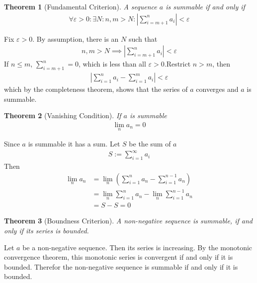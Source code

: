 \documentclass{amsart}
\numberwithin{equation}{section}
\let\oldendproof\endproof
\renewenvironment{proof}[1][\proofname]{%
  \setcounter{case}{0}
  \setcounter{step}{0}
  \oldproof[#1]%
}{\oldendproof}
\theoremstyle{plain}
\newtheorem{theorem}{Theorem}[section]
\theoremstyle{definition}
\theoremstyle{remark}
\begin{document}
\begin{theorem}[Fundamental Criterion]
  A sequence $a$ is summable if and only if
  \begin{align}
    \forall \varepsilon > 0: \exists N: n, m> N: \left| \sum_{i=m+1}^n a_i \right| < \varepsilon
  \end{align}
\end{theorem}
\begin{proof}
  Fix $\varepsilon>0$. By assumption, there is an $N$ such that
  \begin{align}
    n, m > N \implies \left|\sum^n_{i=m+1} a_i \right| < \varepsilon
  \end{align}
  If $n\leq m$, $\sum^n_{i=m+1} = 0$, which is less than all $\varepsilon>0$.Restrict $n>m$, then
  \begin{align}
    \left| \sum^n_{i=1} a_i - \sum^{m}_{i=1} a_i \right| < \varepsilon
  \end{align}
  which by the completeness theorem, shows that the series of $a$ converges and $a$ is summable.
\end{proof}

\begin{theorem}[Vanishing Condition]
  If $a$ is summable
  \begin{align}
    \lim_n a_n = 0
  \end{align}
\end{theorem}
\begin{proof}
  Since $a$ is summable it has a sum. Let $S$ be the sum of $a$
  \begin{align}
    S:= \sum^\infty_{i=1} a_i
  \end{align}
  Then
  \begin{align}
    \lim_n a_n &= \lim_n \left(\sum^n_{i=1} a_n- \sum^{n-1}_{i=1} a_n \right) \\
    &= \lim_n \sum^n_{i=1} a_n - \lim_n \sum^{n-1}_{i=1} a_n\\
    &= S - S = 0
  \end{align}
\end{proof}

\begin{theorem}[Boundness Criterion]
  A non-negative sequence is summable, if and only if its series is bounded.
\end{theorem}
\begin{proof}
  Let $a$ be a non-negative sequence. Then its series is increasing. By the monotonic convergence theorem, this monotonic series is convergent if and only if it is bounded. Therefor the non-negative sequence is summable if and only if it is bounded.
\end{proof}
\end{document}
